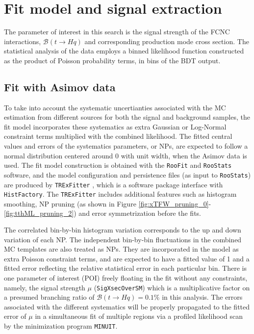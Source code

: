 \section{Fit model and signal extraction}
\label{sec:fit}

The parameter of interest in this search is the signal strength of the FCNC interactions, $\mathcal{B}(t\to Hq)$ and corresponding production mode cross section. The statistical analysis of the data employs a binned likelihood function constructed as the product of Poisson probability terms, in bins of the BDT output.

\subsection{Fit with Asimov data}
\label{sec:fit_asimov}

To take into account the systematic uncertianties associated with the MC estimation from different sources for both the signal and background samples, the fit model incorporates these systematics as extra Gaussian or Log-Normal constraint terms multiplied with the combined likelihood. The fitted central values and errors of the systematics parameters, or NPs, are expected to follow a normal distribution centered around 0 with unit width, when the Asimov data is used. The fit model construction is obtained with the \texttt{RooFit} and \texttt{RooStats} software, and the model configuration and persistence files (as input to \texttt{RooStats}) are produced by \texttt{TRExFitter} \cite{TRExFitter}, which is a software package interface with \texttt{HistFactory}. The \texttt{TRExFitter} includes additional features such as histogram smoothing, NP pruning (as shown in Figure \ref{fig:xTFW_pruning_0}-\ref{fig:tthML_pruning_2}) and error symmetrization before the fits.

The correlated bin-by-bin histogram variation corresponds to the up and down variation of each NP. The independent bin-by-bin fluctuations in the combined MC templates are also treated as NPs. They are incorporated in the model as extra Poisson constraint terms, and are expected to have a fitted value of 1 and a fitted error reflecting the relative statistical error in each particular bin. There is one parameter of interest (POI) freely floating in the fit without any constraints, namely, the signal strength $\mu$ (\texttt{SigXsecOverSM}) which is a multiplicative factor on a presumed branching ratio of $\mathcal{B}(t\to Hq)=0.1\%$ in this analysis. The errors associated with the different systematics will be properly propagated to the fitted error of $\mu$ in a simultaneous fit of multiple regions via a profiled likelihood scan by the minimization program \texttt{MINUIT}. 

